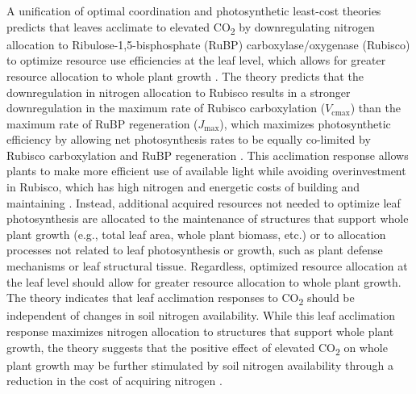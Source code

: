     A unification of optimal coordination and photosynthetic least-cost theories predicts that leaves acclimate to elevated CO\textsubscript{2} by downregulating nitrogen allocation to Ribulose-1,5-bisphosphate (RuBP) carboxylase/oxygenase (Rubisco) to optimize resource use efficiencies at the leaf level, which allows for greater resource allocation to whole plant growth . The theory predicts that the downregulation in nitrogen allocation to Rubisco results in a stronger downregulation in the maximum rate of Rubisco carboxylation ($V_\mathrm{cmax}$) than the maximum rate of RuBP regeneration ($J_\mathrm{max}$), which maximizes photosynthetic efficiency by allowing net photosynthesis rates to be equally co-limited by Rubisco carboxylation and RuBP regeneration . This acclimation response allows plants to make more efficient use of available light while avoiding overinvestment in Rubisco, which has high nitrogen and energetic costs of building and maintaining . Instead, additional acquired resources not needed to optimize leaf photosynthesis are allocated to the maintenance of structures that support whole plant growth (e.g., total leaf area, whole plant biomass, etc.) or to allocation processes not related to leaf photosynthesis or growth, such as plant defense mechanisms or leaf structural tissue. Regardless, optimized resource allocation at the leaf level should allow for greater resource allocation to whole plant growth. The theory indicates that leaf acclimation responses to CO\textsubscript{2} should be independent of changes in soil nitrogen availability. While this leaf acclimation response maximizes nitrogen allocation to structures that support whole plant growth, the theory suggests that the positive effect of elevated CO\textsubscript{2} on whole plant growth may be further stimulated by soil nitrogen availability through a reduction in the cost of acquiring nitrogen .

